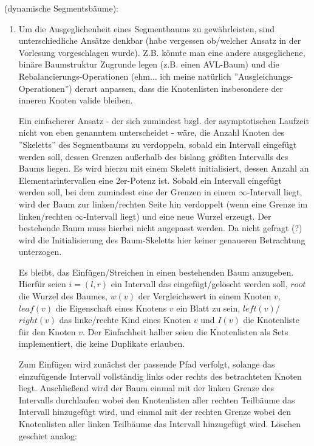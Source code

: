 \documentclass[a4paper, titlepage=false, parskip=full-, 10pt]{scrartcl}
\newcounter{tasknbr}
\newenvironment{task}[1]{{\bf Aufgabe \arabic {tasknbr}\stepcounter{tasknbr}} (#1):\begin{enumerate}}{\end{enumerate}}
\begin{document}
\newpage
\begin{task}{dynamische Segmentsbäume}
\item[]
Um die Ausgeglichenheit eines Segmentbaums zu gewährleisten, sind unterschiedliche Ansätze denkbar (habe vergessen ob/welcher Ansatz in der Vorlesung vorgeschlagen wurde). Z.B. könnte man eine andere ausgeglichene, binäre Baumstruktur Zugrunde legen (z.B. einen AVL-Baum) und die Rebalancierungs-Operationen (ehm... ich meine natürlich ''Ausgleichungs-Operationen'') derart anpassen, dass die Knotenlisten insbesondere der inneren Knoten valide bleiben.

Ein einfacherer Ansatz - der sich zumindest bzgl. der asymptotischen Laufzeit nicht von eben genanntem unterscheidet - wäre, die Anzahl Knoten des ''Skeletts'' des Segmentbaums zu verdoppeln, sobald ein Intervall eingefügt werden soll, dessen Grenzen außerhalb des bislang größten Intervalls des Baums liegen. Es wird hierzu mit einem Skelett initialisiert, dessen Anzahl an Elementarintervallen eine 2er-Potenz ist. Sobald ein Intervall eingefügt werden soll, bei dem zumindest eine der Grenzen in einem $\infty$-Intervall liegt, wird der Baum zur linken/rechten Seite hin verdoppelt (wenn eine Grenze im linken/rechten $\infty$-Intervall liegt) und eine neue Wurzel erzeugt. Der bestehende Baum muss hierbei nicht angepasst werden. Da nicht gefragt (?) wird die Initialisierung des Baum-Skeletts hier keiner genaueren Betrachtung unterzogen.

Es bleibt, das Einfügen/Streichen in einen bestehenden Baum anzugeben. Hierfür seien $i=(l,r)$ ein Intervall das eingefügt/gelöscht werden soll, $root$ die Wurzel des Baumes, $w(v)$ der Vergleichswert in einem Knoten $v$, $leaf(v)$ die Eigenschaft eines Knotens $v$ ein Blatt zu sein, $left(v)$/$right(v)$ das linke/rechte Kind eines Knoten $v$ und $I(v)$ die Knotenliste für den Knoten $v$. Der Einfachheit halber seien die Knotenlisten als Sets implementiert, die keine Duplikate erlauben.

Zum Einfügen wird zunächst der passende Pfad verfolgt, solange das einzufügende Intervall vollständig links oder rechts des betrachteten Knoten liegt. Anschließend wird der Baum einmal mit der linken Grenze des Intervalls durchlaufen wobei den Knotenlisten aller rechten Teilbäume das Intervall hinzugefügt wird, und einmal mit der rechten Grenze wobei den Knotenlisten aller linken Teilbäume das Intervall hinzugefügt wird. Löschen geschiet analog:


\end{task}
\end{document}
